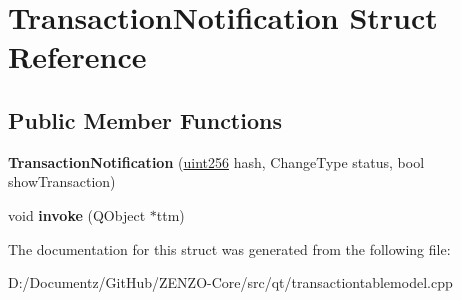 \hypertarget{struct_transaction_notification}{}\section{Transaction\+Notification Struct Reference}
\label{struct_transaction_notification}
\subsection*{Public Member Functions}
\begin{DoxyCompactItemize}
\item 
\mbox{\label{struct_transaction_notification_a9c98f1364757e2a6d357d93c7c5fbd71}} 
{\bfseries Transaction\+Notification} (\mbox{\hyperlink{classuint256}{uint256}} hash, Change\+Type status, bool show\+Transaction)
\item 
\mbox{\label{struct_transaction_notification_a6351a5b93f908a2df2e854e08178edb3}} 
void {\bfseries invoke} (Q\+Object $\ast$ttm)
\end{DoxyCompactItemize}


The documentation for this struct was generated from the following file\+:\begin{DoxyCompactItemize}
\item 
D\+:/\+Documentz/\+Git\+Hub/\+Z\+E\+N\+Z\+O-\/\+Core/src/qt/transactiontablemodel.\+cpp\end{DoxyCompactItemize}
